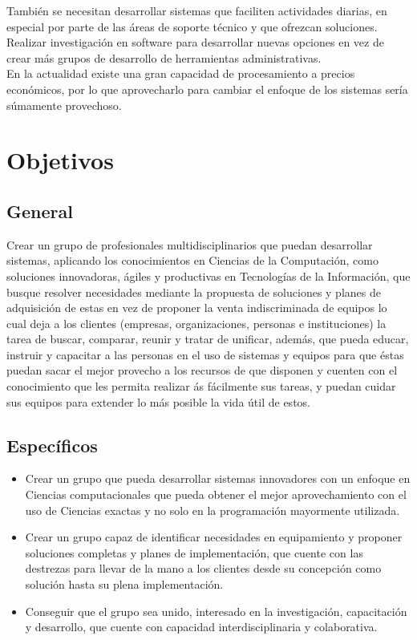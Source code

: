 \documentclass[12pt,spanish,lettersize]{report}
\begin{document}
Tambi\'en se necesitan desarrollar sistemas que faciliten actividades diarias, en especial por parte de las \'areas de soporte t\'ecnico y que ofrezcan soluciones.\\

Realizar investigaci\'on en software para desarrollar nuevas opciones en vez de crear m\'as grupos de desarrollo de herramientas administrativas.\\

En la actualidad existe una gran capacidad de procesamiento a precios econ\'omicos, por lo que aprovecharlo para cambiar el enfoque de los sistemas ser\'ia s\'umamente provechoso.

\section{Objetivos}
\subsection{General}
Crear un grupo de profesionales multidisciplinarios que puedan desarrollar sistemas, aplicando los conocimientos en Ciencias de la Computaci\'on, como soluciones innovadoras, \'agiles y productivas en Tecnolog\'ias de la Informaci\'on, que busque resolver necesidades mediante la propuesta de soluciones y planes de adquisici\'on de estas en vez de proponer la venta indiscriminada de equipos lo cual deja a los clientes (empresas, organizaciones, personas e instituciones) la tarea de buscar, comparar, reunir y tratar de unificar, adem\'as, que pueda educar, instruir y capacitar a las personas en el uso de sistemas y equipos para que \'estas puedan sacar el mejor provecho a los recursos de que disponen y cuenten con el conocimiento que les permita realizar \'as f\'acilmente sus tareas, y puedan cuidar sus equipos para extender lo m\'as posible la vida \'util de estos.
\subsection{Espec\'ificos}
\begin{itemize}
\item Crear un grupo que pueda desarrollar sistemas innovadores con un enfoque en Ciencias computacionales que pueda obtener el mejor aprovechamiento con el uso de Ciencias exactas y no solo en la programaci\'on mayormente utilizada.
\item Crear un grupo capaz de identificar necesidades en equipamiento y proponer soluciones completas y planes de implementaci\'on, que cuente con las destrezas para llevar de la mano a los clientes desde su concepci\'on como soluci\'on hasta su plena implementaci\'on.
\item Conseguir que el grupo sea unido, interesado en la investigaci\'on, capacitaci\'on y desarrollo, que cuente con capacidad interdisciplinaria y colaborativa.
\end{itemize}
\end{document}
